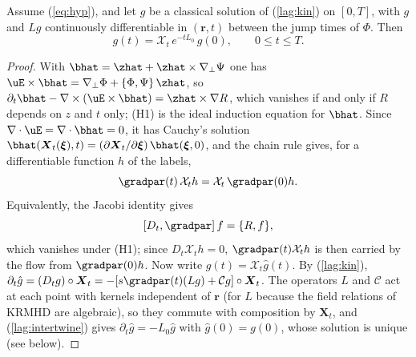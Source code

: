 \begin{theorem}\label{thm:frozen}
Assume (\ref{eq:hyp}), and let $g$ be a classical solution of (\ref{lag:kin}) on $[0,T]$, with $g$ and $Lg$ continuously differentiable in $(\boldsymbol r,t)$ between the jump times of $\Phi$. Then
\begin{equation}\label{eq:frozen}
  g(t)=\mathcal X_t\,e^{-tL_0}\,g(0),\qquad 0\le t\le T .
\end{equation}
\end{theorem}

\begin{proof}
With $\bhat=\zhat+\zhat\times\nabla_\perp\Psi$ one has $\uE\times\bhat=\nabla_\perp\Phi+\{\Phi,\Psi\}\,\zhat$, so $\partial_t\bhat-\nabla\times(\uE\times\bhat)=\zhat\times\nabla R$, which vanishes if and only if $R$ depends on $z$ and $t$ only; (H1) is the ideal induction equation for $\bhat$. Since $\nabla\cdot\uE=\nabla\cdot\bhat=0$, it has Cauchy's solution \citep[example~3]{Webb2014} $\bhat(\boldsymbol X_t(\boldsymbol\xi),t)=(\partial\boldsymbol X_t/\partial\boldsymbol\xi)\,\bhat(\boldsymbol\xi,0)$, and the chain rule gives, for a differentiable function $h$ of the labels,
\begin{equation}\label{lag:intertwine}
  \gradpar(t)\,\mathcal X_th=\mathcal X_t\,\gradpar(0)h .
\end{equation}
Equivalently, the Jacobi identity gives
\begin{equation}\label{lag:commutator}
  [D_t,\gradpar]\,f=\{R,f\},
\end{equation}
which vanishes under (H1); since $D_t\mathcal X_th=0$, $\gradpar(t)\mathcal X_th$ is then carried by the flow from $\gradpar(0)h$. Now write $g(t)=\mathcal X_t\hat g(t)$. By (\ref{lag:kin}), $\partial_t\hat g=(D_tg)\circ\boldsymbol X_t=-[s\gradpar(t)(Lg)+\mathcal Cg]\circ\boldsymbol X_t$. The operators $L$ and $\mathcal C$ act at each point with kernels independent of $\boldsymbol r$ (for $L$ because the field relations of KRMHD are algebraic), so they commute with composition by $\boldsymbol X_t$, and (\ref{lag:intertwine}) gives $\partial_t\hat g=-L_0\hat g$ with $\hat g(0)=g(0)$, whose solution is unique (see below).
\end{proof}

